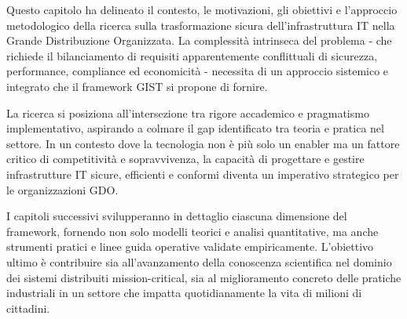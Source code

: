 Questo capitolo ha delineato il contesto, le motivazioni, gli obiettivi e l'approccio metodologico della ricerca sulla trasformazione sicura dell'infrastruttura IT nella Grande Distribuzione Organizzata. La complessità intrinseca del problema - che richiede il bilanciamento di requisiti apparentemente conflittuali di sicurezza, performance, compliance ed economicità - necessita di un approccio sistemico e integrato che il framework GIST si propone di fornire.

La ricerca si posiziona all'intersezione tra rigore accademico e pragmatismo implementativo, aspirando a colmare il gap identificato tra teoria e pratica nel settore. In un contesto dove la tecnologia non è più solo un enabler ma un fattore critico di competitività e sopravvivenza, la capacità di progettare e gestire infrastrutture IT sicure, efficienti e conformi diventa un imperativo strategico per le organizzazioni GDO.

I capitoli successivi svilupperanno in dettaglio ciascuna dimensione del framework, fornendo non solo modelli teorici e analisi quantitative, ma anche strumenti pratici e linee guida operative validate empiricamente. L'obiettivo ultimo è contribuire sia all'avanzamento della conoscenza scientifica nel dominio dei sistemi distribuiti mission-critical, sia al miglioramento concreto delle pratiche industriali in un settore che impatta quotidianamente la vita di milioni di cittadini.

\clearpage
\printbibliography[
    heading=subbibliography,
    title={Riferimenti Bibliografici del Capitolo 1},
]

\endrefsection
